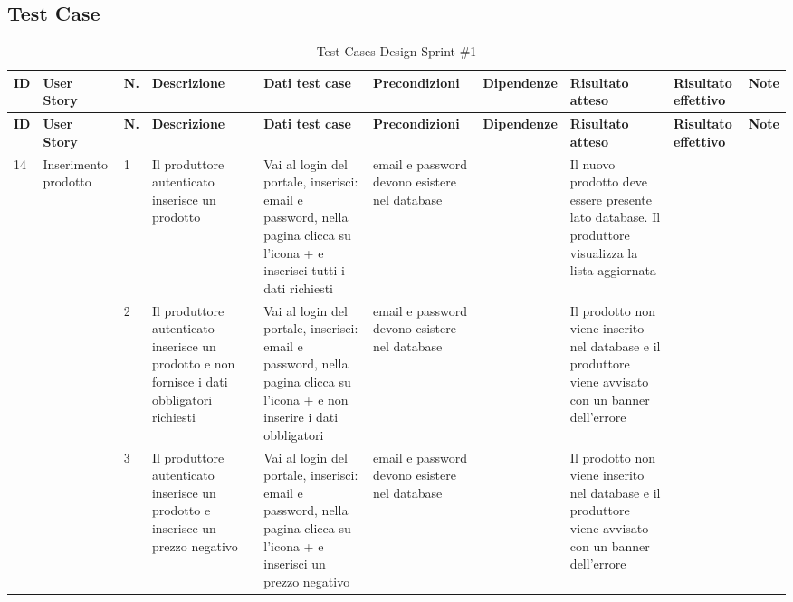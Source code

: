 \subsection{Test Case}

\begin{landscape}

\begin{longtable}
{p{0.4cm}|p{2.4cm}|p{0.4cm}|p{2.5cm}|p{3cm}|p{2.5cm}|p{2cm}|p{2.5cm}|p{2.5cm}|p{2cm}}
\caption{Test Cases Design Sprint \#1}\label{tab:TestCasesSprint1} \\
\hline
\textbf{ID} &\textbf{User Story} & \textbf{N.}& \textbf{Descrizione} & \textbf{Dati test case} & \textbf{Precondizioni} & \textbf{Dipendenze}& \textbf{Risultato atteso} & \textbf{Risultato effettivo} & \textbf{Note}  \\
\hline
\endfirsthead

\hline
\textbf{ID} &\textbf{User Story} & \textbf{N.} & \textbf{Descrizione} &\textbf{Dati test case} & \textbf{Precondizioni} & \textbf{Dipendenze}& \textbf{Risultato atteso} & \textbf{Risultato effettivo} & \textbf{Note}  \\
\hline
\endhead


\multirow{19}{0.2cm}{14} & \multirow{19}{0.2cm}{Inserimento prodotto} 
& 1 & Il produttore autenticato inserisce un prodotto & Vai al login del portale, inserisci: email e password, nella pagina clicca su l'icona + e inserisci tutti i dati richiesti & email e password devono esistere nel database& & Il nuovo prodotto deve essere presente lato database. Il produttore visualizza la lista aggiornata& & \\

&& 2 & Il produttore autenticato inserisce un prodotto e non fornisce i dati obbligatori richiesti & Vai al login del portale, inserisci: email e password, nella pagina clicca su l'icona + e non inserire i dati obbligatori  & email e password devono esistere nel database& & Il prodotto non viene inserito nel database e il produttore viene avvisato con un banner dell'errore& & \\

&& 3 & Il produttore autenticato inserisce un prodotto e inserisce un prezzo negativo & Vai al login del portale, inserisci: email e password, nella pagina clicca su l'icona + e inserisci un prezzo negativo & email e password devono esistere nel database& & Il prodotto non viene inserito nel database e il produttore viene avvisato con un banner dell'errore& & \\


\end{longtable}
\end{landscape}
